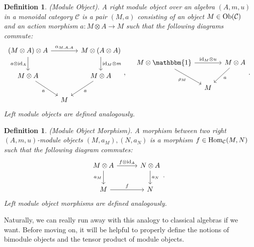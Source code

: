 \documentclass[12pt, reqno]{amsart}
\numberwithin{equation}{section}
\theoremstyle{plainspace}
\theoremstyle{definitionspace}
\newtheorem{definition}[theorem]{Definition}
\theoremstyle{remarkspace}
\newcommand{\id}{\textup{id}}
\newcommand{\mathcat}[1]{\mathcal{#1}}
\newcommand{\Ob}{\textup{Ob}}
\newcommand{\Hom}[2][]{
	\ifthenelse{\equal{#2}{}}
		{\textup{Hom}_{#1}}
		{\textup{Hom}_{#1}\!\left(#2\right)}
}
\begin{document}
\begin{definition}\label{def:module_object}{\em (Module Object).} \cite[Definition 8(ii)]{Ostrik_2003}
A right module object over an algebra $(A, m, u)$ in a monoidal category $\mathcat{C}$ is a pair $(M, a)$ consisting of an object $M \in \Ob(\mathcat{C})$ and an action morphism $a : M \otimes A \to M$ such that the following diagrams commute:
\begin{equation}
\begin{tikzcd}[column sep = 1.0em, row sep = 2.0em]
{(M \otimes A) \otimes A} \arrow[d, "{a \otimes \id_A}"'] \arrow[rr, "{\alpha_{M,A,A}}"] & & {M \otimes (A \otimes A)} \arrow[d, "{\id_M \otimes m}"] \\
{M \otimes A} \arrow[dr, "{a}"'] & & {M \otimes A} \arrow[dl, "{a}"] \\
& M
\end{tikzcd},
\quad
\begin{tikzcd}[column sep = 1.0em, row sep = 2.0em]
{M \otimes \mathbbm{1}} \arrow[dr, "{\rho_M}"'] \arrow[rr, "{\id_M \otimes u}"] & & {M \otimes A} \arrow[dl, "{a}"] \\
& M
\end{tikzcd}.
\label{eq:module_object_diagrams}
\end{equation}
Left module objects are defined analogously.
\end{definition}
\leavevmode

\begin{definition}\label{def:module_object_morphism}{\em (Module Object Morphism).} \cite[Definition 8(iii)]{Ostrik_2003}
A morphism between two right $(A, m, u)$-module objects $(M, a_M), (N, a_N)$ is a morphism $f \in \Hom[\mathcat{C}]{M, N}$ such that the following diagram commutes:
\begin{equation}
\begin{tikzcd}[column sep = 3.0em, row sep = 2.0em]
{M \otimes A} \arrow[r, "{f \otimes \id_A}"] \arrow[d, "{a_M}"'] & {N \otimes A} \arrow[d, "{a_N}"] \\
{M} \arrow[r, "{f}"] & {N}
\end{tikzcd}.
\label{eq:module_object_morphism_diagram}
\end{equation}
Left module object morphisms are defined analogously.
\end{definition}
\leavevmode

\noindent Naturally, we can really run away with this analogy to classical algebras if we want. Before moving on, it will be helpful to properly define the notions of bimodule objects and the tensor product of module objects.
\newline
\end{document}
